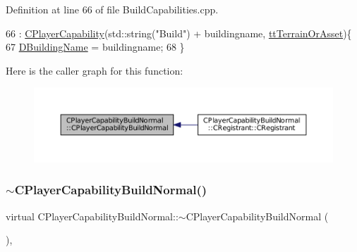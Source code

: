 Definition at line 66 of file Build\+Capabilities.\+cpp.


\begin{DoxyCode}
66                                                                                         : 
      \hyperlink{classCPlayerCapability_a303de62aba5d3f65d9a8e013c64a96c1}{CPlayerCapability}(std::string(\textcolor{stringliteral}{"Build"}) + buildingname, 
      \hyperlink{classCPlayerCapability_a9d3450ed1532fd536bd6cbb1e2eef02fa67cc6d11bc0aafc1b786bd6557ba4aa2}{ttTerrainOrAsset})\{
67     \hyperlink{classCPlayerCapabilityBuildNormal_aae09d6cee5f8e201a0139c9065a5577c}{DBuildingName} = buildingname;
68 \}
\end{DoxyCode}
Here is the caller graph for this function\+:\nopagebreak
\begin{figure}[H]
\begin{center}
\leavevmode
\includegraphics[width=350pt]{classCPlayerCapabilityBuildNormal_a36157bf1a2875f0831b646dd2313a464_icgraph}
\end{center}
\end{figure}
\hypertarget{classCPlayerCapabilityBuildNormal_aed39be621a98ed6d1aaf470cd5bf1ff5}{}\label{classCPlayerCapabilityBuildNormal_aed39be621a98ed6d1aaf470cd5bf1ff5} 
\subsubsection{\texorpdfstring{$\sim$\+C\+Player\+Capability\+Build\+Normal()}{~CPlayerCapabilityBuildNormal()}}
{\footnotesize\ttfamily virtual C\+Player\+Capability\+Build\+Normal\+::$\sim$\+C\+Player\+Capability\+Build\+Normal (\begin{DoxyParamCaption}{ }\end{DoxyParamCaption})\hspace{0.3cm}{\ttfamily [inline]}, {\ttfamily [virtual]}}



